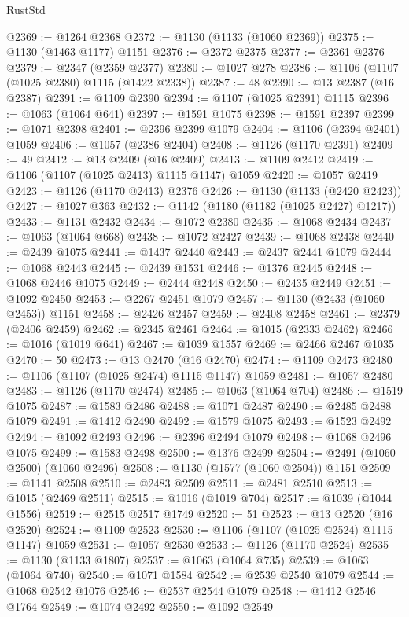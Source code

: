 \begin{lexlean}{RustStd}
\begin{coremodule}
@2369 := @1264 @2368
@2372 := @1130 (@1133 (@1060 @2369))
@2375 := @1130 (@1463 @1177) @1151
@2376 := @2372 @2375
@2377 := @2361 @2376
@2379 := @2347 (@2359 @2377)
@2380 := @1027 @278
@2386 := @1106 (@1107 (@1025 @2380) @1115 (@1422 @2338))
@2387 := 48
@2390 := @13 @2387 (@16 @2387)
@2391 := @1109 @2390
@2394 := @1107 (@1025 @2391) @1115
@2396 := @1063 (@1064 @641)
@2397 := @1591 @1075
@2398 := @1591 @2397
@2399 := @1071 @2398
@2401 := @2396 @2399 @1079
@2404 := @1106 (@2394 @2401) @1059
@2406 := @1057 (@2386 @2404)
@2408 := @1126 (@1170 @2391)
@2409 := 49
@2412 := @13 @2409 (@16 @2409)
@2413 := @1109 @2412
@2419 := @1106 (@1107 (@1025 @2413) @1115 @1147) @1059
@2420 := @1057 @2419
@2423 := @1126 (@1170 @2413) @2376
@2426 := @1130 (@1133 (@2420 @2423))
@2427 := @1027 @363
@2432 := @1142 (@1180 (@1182 (@1025 @2427) @1217))
@2433 := @1131 @2432
@2434 := @1072 @2380
@2435 := @1068 @2434
@2437 := @1063 (@1064 @668)
@2438 := @1072 @2427
@2439 := @1068 @2438
@2440 := @2439 @1075
@2441 := @1437 @2440
@2443 := @2437 @2441 @1079
@2444 := @1068 @2443
@2445 := @2439 @1531
@2446 := @1376 @2445
@2448 := @1068 @2446 @1075
@2449 := @2444 @2448
@2450 := @2435 @2449
@2451 := @1092 @2450
@2453 := @2267 @2451 @1079
@2457 := @1130 (@2433 (@1060 @2453)) @1151
@2458 := @2426 @2457
@2459 := @2408 @2458
@2461 := @2379 (@2406 @2459)
@2462 := @2345 @2461
@2464 := @1015 (@2333 @2462)
@2466 := @1016 (@1019 @641)
@2467 := @1039 @1557
@2469 := @2466 @2467 @1035
@2470 := 50
@2473 := @13 @2470 (@16 @2470)
@2474 := @1109 @2473
@2480 := @1106 (@1107 (@1025 @2474) @1115 @1147) @1059
@2481 := @1057 @2480
@2483 := @1126 (@1170 @2474)
@2485 := @1063 (@1064 @704)
@2486 := @1519 @1075
@2487 := @1583 @2486
@2488 := @1071 @2487
@2490 := @2485 @2488 @1079
@2491 := @1412 @2490
@2492 := @1579 @1075
@2493 := @1523 @2492
@2494 := @1092 @2493
@2496 := @2396 @2494 @1079
@2498 := @1068 @2496 @1075
@2499 := @1583 @2498
@2500 := @1376 @2499
@2504 := @2491 (@1060 @2500) (@1060 @2496)
@2508 := @1130 (@1577 (@1060 @2504)) @1151
@2509 := @1141 @2508
@2510 := @2483 @2509
@2511 := @2481 @2510
@2513 := @1015 (@2469 @2511)
@2515 := @1016 (@1019 @704)
@2517 := @1039 (@1044 @1556)
@2519 := @2515 @2517 @1749
@2520 := 51
@2523 := @13 @2520 (@16 @2520)
@2524 := @1109 @2523
@2530 := @1106 (@1107 (@1025 @2524) @1115 @1147) @1059
@2531 := @1057 @2530
@2533 := @1126 (@1170 @2524)
@2535 := @1130 (@1133 @1807)
@2537 := @1063 (@1064 @735)
@2539 := @1063 (@1064 @740)
@2540 := @1071 @1584
@2542 := @2539 @2540 @1079
@2544 := @1068 @2542 @1076
@2546 := @2537 @2544 @1079
@2548 := @1412 @2546 @1764
@2549 := @1074 @2492
@2550 := @1092 @2549

\end{coremodule}
\end{lexlean}
